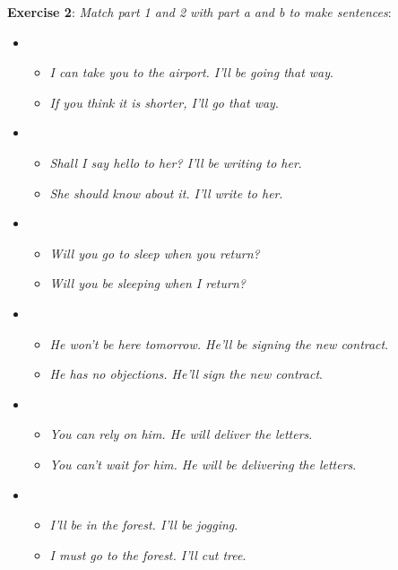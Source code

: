 \textbf{Exercise 2}: \textit{Match part 1 and 2 with part a and b to make sentences}:

\begin{itemize}

\item
\begin{itemize} 
\item \textit{I can take you to the airport. I'll be going that way}.
\item \textit{If you think it is shorter, I'll go that way}.
\end{itemize}

\item
\begin{itemize}
\item \textit{Shall I say hello to her? I'll be writing to her}.
\item \textit{She should know about it. I'll write to her}.
\end{itemize}

\item
\begin{itemize}
\item \textit{Will you go to sleep when you return?}
\item \textit{Will you be sleeping when I return?}
\end{itemize}

\item
\begin{itemize}
\item \textit{He won't be here tomorrow. He'll be signing the new contract}. 
\item \textit{He has no objections. He'll sign the new contract}.
\end{itemize}

\item
\begin{itemize}
\item \textit{You can rely on him. He will deliver the letters}.
\item \textit{You can't wait for him. He will be delivering the letters}.
\end{itemize}

\item
\begin{itemize}
\item \textit{I'll be in the forest. I'll be jogging}.
\item \textit{I must go to the forest. I'll cut tree}.
\end{itemize}


\end{itemize}
